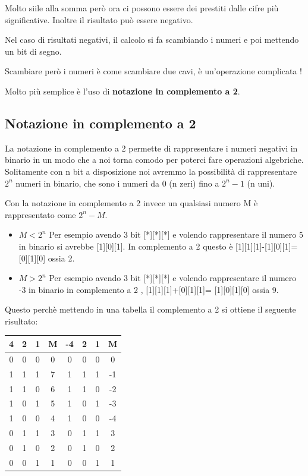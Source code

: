 \documentclass[a4paper]{book}
\begin{document}
Molto siile alla somma però ora ci possono essere dei prestiti dalle cifre più significative.
Inoltre il risultato può essere negativo.


Nel caso di risultati negativi, il calcolo si fa scambiando i numeri e poi mettendo un bit di segno.

Scambiare però i numeri è come scambiare due cavi, è un'operazione complicata !

Molto più semplice è l'uso di \textbf{notazione in complemento a 2}. 

\subsection{Notazione in complemento a 2}

La notazione in complemento a 2 permette di rappresentare i numeri negativi in binario in un modo che a noi torna comodo per poterci fare operazioni algebriche.\\
Solitamente con n bit a disposizione noi avremmo la possibilità di rappresentare \(2^n\) numeri in binario, che sono i numeri da 0 (n zeri) fino a \(2^n-1\) (n uni).

Con la notazione in complemento a 2 invece un qualsiasi numero M è rappresentato come \(2^n-M\).

\begin{itemize}
\item{\(M<2^n\)}
Per esempio avendo 3 bit [*][*][*] e volendo rappresentare il numero 5 in binario si avrebbe [1][0][1].
In complemento a 2 questo è [1][1][1]-[1][0][1]=[0][1][0] ossia 2.
\item{\(M>2^n\)}
Per esempio avendo 3 bit [*][*][*] e volendo rappresentare il numero -3 in binario in complemento a 2 , [1][1][1]+[0][1][1]= [1][0][1][0] ossia 9.

\end{itemize}

Questo perchè mettendo in una tabella il complemento a 2 si ottiene il seguente risultato:

\begin{tabular}{|c|c|c|c||c|c|c|c|}
\hline
4 & 2 & 1 & M & -4 & 2 & 1 & M  \\
\hline
0 & 0 & 0 & 0 &  0 & 0 & 0 & 0  \\
\hline
1 & 1 & 1 & 7 &  1 & 1 & 1 & -1 \\
\hline
1 & 1 & 0 & 6 &  1 & 1 & 0 & -2 \\
\hline
1 & 0 & 1 & 5 &  1 & 0 & 1 & -3 \\
\hline
1 & 0 & 0 & 4 &  1 & 0 & 0 & -4 \\
\hline
0 & 1 & 1 & 3 &  0 & 1 & 1 & 3  \\
\hline
0 & 1 & 0 & 2 &  0 & 1 & 0 & 2  \\
\hline
0 & 0 & 1 & 1 &  0 & 0 & 1 & 1  \\
\hline
\end{tabular}
\end{document}
